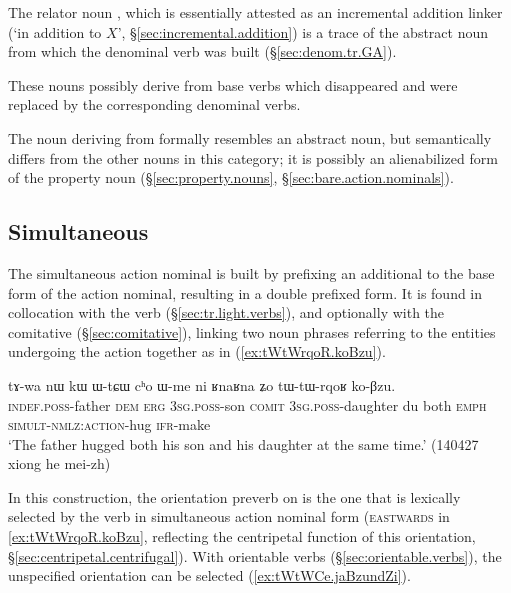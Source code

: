 The relator noun , which is essentially attested as an incremental addition linker (`in addition to $X$', §\ref{sec:incremental.addition}) is a trace of the abstract noun from which the denominal verb  was built (§\ref{sec:denom.tr.GA}).

These nouns possibly derive from base verbs which disappeared and were replaced by the corresponding denominal verbs.

The noun  deriving from  formally resembles an abstract noun, but semantically differs from the other nouns in this category; it is possibly an alienabilized form of the property noun  (§\ref{sec:property.nouns}, §\ref{sec:bare.action.nominals}).

  

\subsection{Simultaneous} \label{sec:simultaneous.action.nominal}
The simultaneous action nominal is built by prefixing an additional  to the base form of the action nominal, resulting in a double  prefixed form. It is found in collocation with the verb  (§\ref{sec:tr.light.verbs}), and optionally with the comitative  (§\ref{sec:comitative}), linking two noun phrases referring to the entities undergoing the action together as in (\ref{ex:tWtWrqoR.koBzu}).


\begin{exe}
	\ex \label{ex:tWtWrqoR.koBzu}
	\gll tɤ-wa nɯ kɯ ɯ-tɕɯ cʰo ɯ-me ni ʁnaʁna ʑo tɯ-tɯ-rqoʁ ko-βzu. \\
	\textsc{indef}.\textsc{poss}-father \textsc{dem} \textsc{erg} \textsc{3sg}.\textsc{poss}-son \textsc{comit} \textsc{3sg}.\textsc{poss}-daughter du both \textsc{emph} \textsc{simult}-\textsc{nmlz}:\textsc{action}-hug \textsc{ifr}-make \\
	\glt `The father hugged both his son and his daughter at the same time.' (140427 xiong he mei-zh)
 \end{exe}

In this construction, the orientation preverb on  is the one that is lexically selected by the verb in simultaneous action nominal form (\textsc{eastwards} in \ref{ex:tWtWrqoR.koBzu}, reflecting the centripetal function of this orientation, §\ref{sec:centripetal.centrifugal}). With orientable verbs (§\ref{sec:orientable.verbs}), the unspecified orientation   can be selected (\ref{ex:tWtWCe.jaBzundZi}). 
 
